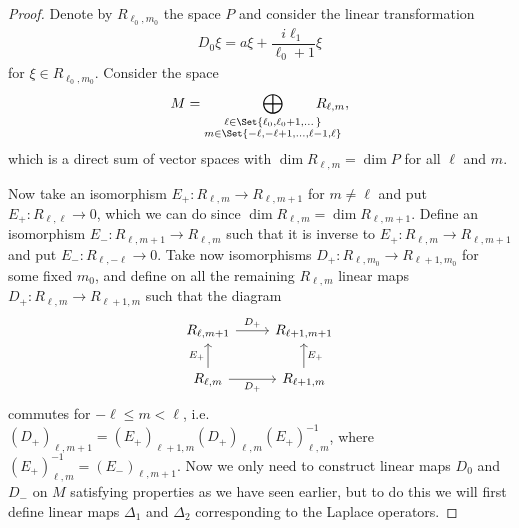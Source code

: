 \begin{proof}
  Denote by $R_{\ell_0,m_0}$ the space $P$ and consider the linear transformation
  \begin{align*}
    D_0 \xi = a\xi + \dfrac{i\ell_1}{\ell_0+1}\xi
  \end{align*}
  for $\xi\in R_{\ell_0,m_0}$. Consider the space
  \begin{align*}
    M = \bigoplus_{\substack{\ell\in\Set{\ell_0,\ell_0+1,\dotsc} \\ m\in\Set{-\ell,-\ell+1,\dotsc,\ell-1,\ell}}} \!\!\!\!\!\!\!\!\!\!\!\! R_{\ell,m},
  \end{align*}
  which is a direct sum of vector spaces with $\dim R_{\ell,m} = \dim P$ for all $\ell$ and $m$.

  Now take an isomorphism $E_+\colon R_{\ell,m}\to R_{\ell,m+1}$ for $m\neq \ell$ and put $E_+\colon R_{\ell,\ell}\to 0$, which we can do since $\dim R_{\ell,m}=\dim R_{\ell,m+1}$. Define an isomorphism $E_-\colon R_{\ell,m+1}\to R_{\ell,m}$ such that it is inverse to $E_+\colon R_{\ell,m}\to R_{\ell,m+1}$ and put $E_-\colon R_{\ell,-\ell}\to 0$. Take now isomorphisms $D_+\colon R_{\ell,m_0}\to R_{\ell+1,m_0}$ for some fixed $m_0$, and define on all the remaining $R_{\ell,m}$ linear maps $D_+\colon R_{\ell,m}\to R_{\ell+1,m}$ such that the diagram
  \[
    \begin{tikzcd}
      R_{\ell,m+1} \ar[r,"D_+"] & R_{\ell+1,m+1} \\
      R_{\ell,m}\ar[u,"E_+"] \ar[r,"D_+",swap] & R_{\ell+1,m}\ar[u,"E_+",swap]
    \end{tikzcd}
  \]
  commutes for $-\ell\leq m<\ell$, i.e.\ $(D_+)_{\ell,m+1}=(E_+)_{\ell+1,m} (D_+)_{\ell,m} (E_+)_{\ell,m}^{-1}$, where $(E_+)_{\ell,m}^{-1}=(E_-)_{\ell,m+1}$. Now we only need to construct linear maps $D_0$ and $D_-$ on $M$ satisfying properties as we have seen earlier, but to do this we will first define linear maps $\Delta_1$ and $\Delta_2$ corresponding to the Laplace operators.


\end{proof}
